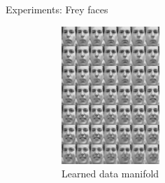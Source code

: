 \documentclass[unicode,11pt]{beamer}
\begin{document}
\begin{frame}{Experiments: Frey faces}
  \begin{figure}
    \centering
    \begin{subfigure}[b]{.4\linewidth}
      \centering
      \includegraphics[width=.8\linewidth]{images/vae_frey_B100_E4000_N560_L2_H200_C_manifold_8}
      \caption{Learned data manifold}
    \end{subfigure}
    \hspace{1em}
    \begin{subfigure}[b]{.4\linewidth}
      \centering

\end{subfigure}
\end{figure}
\end{frame}
\end{document}
